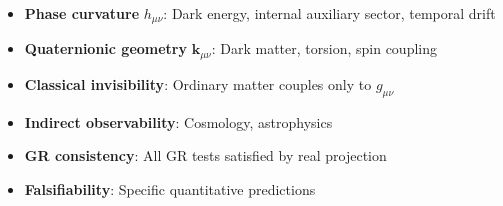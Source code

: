 \begin{itemize}
    \item \textbf{Phase curvature} $h_{\mu\nu}$: Dark energy, internal auxiliary sector, temporal drift
    \item \textbf{Quaternionic geometry} $\mathbf{k}_{\mu\nu}$: Dark matter, torsion, spin coupling
    \item \textbf{Classical invisibility}: Ordinary matter couples only to $g_{\mu\nu}$
    \item \textbf{Indirect observability}: Cosmology, astrophysics
    \item \textbf{GR consistency}: All GR tests satisfied by real projection
    \item \textbf{Falsifiability}: Specific quantitative predictions
\end{itemize}

